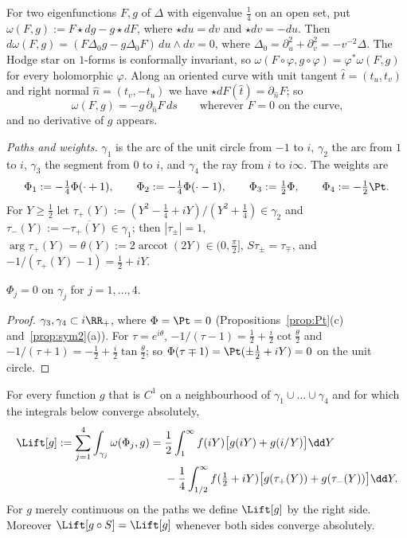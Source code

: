 For two eigenfunctions $F,g$ of $\Delta$ with eigenvalue $\frac14$ on an open set, put $\omega(F,g):=F\star dg-g\star dF$, where $\star du=dv$
and $\star dv=-du$. Then $d\omega(F,g)=(F\Delta_0g-g\Delta_0F)\,du\wedge dv=0$, where $\Delta_0=\partial_u^2+\partial_v^2=-v^{-2}\Delta$. The
Hodge star on $1$-forms is conformally invariant, so $\omega(F\circ\varphi,g\circ\varphi)=\varphi^*\omega(F,g)$ for every holomorphic $\varphi$. Along
an oriented curve with unit tangent $\hat t=(t_u,t_v)$ and right normal $\hat n=(t_v,-t_u)$ we have $\star dF(\hat t)=\partial_{\hat n}F$; so
\begin{equation}\label{eq:green-on-zero}
\omega(F,g)=-g\,\partial_{\hat n}F\,ds\qquad\text{wherever $F=0$ on the curve,}
\end{equation}
and no derivative of $g$ appears.

\emph{Paths and weights.} $\gamma_1$ is the arc of the unit circle from $-1$ to $i$, $\gamma_2$ the arc from $1$ to $i$, $\gamma_3$ the segment from
$0$ to $i$, and $\gamma_4$ the ray from $i$ to $i\infty$. The weights are
\[
\Phi_1:=-\tfrac14\Phi(\cdot+1),\qquad\Phi_2:=-\tfrac14\Phi(\cdot-1),\qquad\Phi_3:=\tfrac12\Phi,\qquad\Phi_4:=-\tfrac12\Pt .
\]
For $Y\ge\frac12$ let $\tau_+(Y):=(Y^2-\frac14+iY)/(Y^2+\frac14)\in\gamma_2$ and $\tau_-(Y):=-\overline{\tau_+(Y)}\in\gamma_1$; then $|\tau_\pm|=1$,
$\arg\tau_+(Y)=\theta(Y):=2\operatorname{arccot}(2Y)\in(0,\frac\pi2]$, $S\tau_\pm=\tau_\mp$, and $-1/(\tau_+(Y)-1)=\frac12+iY$.

\begin{lemma}\label{lem:weights}
$\Phi_j=0$ on $\gamma_j$ for $j=1,\dots,4$.
\end{lemma}

\begin{proof}
$\gamma_3,\gamma_4\subset i\RR_+$, where $\Phi=\Pt=0$ (Propositions~\ref{prop:Pt}(c) and~\ref{prop:sym2}(a)). For $\tau=e^{i\theta}$,
$-1/(\tau-1)=\frac12+\frac i2\cot\frac\theta2$ and $-1/(\tau+1)=-\frac12+\frac i2\tan\frac\theta2$; so $\Phi(\tau\mp1)=\Pt(\pm\frac12+iY)=0$ on the unit circle.
\end{proof}

\begin{lemma}\label{lem:four-path}
For every function $g$ that is $C^1$ on a neighbourhood of $\gamma_1\cup\dots\cup\gamma_4$ and for which the integrals below converge
absolutely,
\begin{equation}\label{eq:four-path}
\begin{split}
\Lift[g]:=\sum_{j=1}^4\int_{\gamma_j}\omega(\Phi_j,g)={}&\frac12\int_1^\infty f(iY)\big[g(iY)+g(i/Y)\big]\dd Y\\
&-\frac14\int_{1/2}^\infty f(\tfrac12+iY)\big[g(\tau_+(Y))+g(\tau_-(Y))\big]\dd Y .
\end{split}
\end{equation}
For $g$ merely continuous on the paths we define $\Lift[g]$ by the right side. Moreover $\Lift[g\circ S]=\Lift[g]$ whenever both sides converge
absolutely.
\end{lemma}

